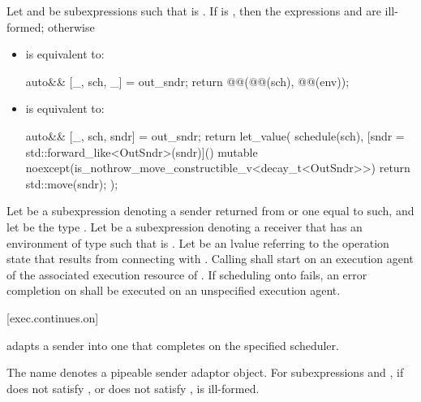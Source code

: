 \pnum
Let  and  be subexpressions
such that  is .
If  is ,
then the expressions  and\linebreak
{} are ill-formed; otherwise
\begin{itemize}
\item
{} is equivalent to:
\begin{codeblock}
auto&& [_, sch, _] = out_sndr;
return @@(@@(sch), @@(env));
\end{codeblock}
\item
{} is equivalent to:
\begin{codeblock}
auto&& [_, sch, sndr] = out_sndr;
return let_value(
  schedule(sch),
  [sndr = std::forward_like<OutSndr>(sndr)]() mutable
    noexcept(is_nothrow_move_constructible_v<decay_t<OutSndr>>) {
    return std::move(sndr);
  });
\end{codeblock}
\end{itemize}

\pnum
Let  be a subexpression denoting
a sender returned from  or one equal to such, and
let  be the type .
Let  be a subexpression denoting a receiver
that has an environment of type 
such that  is .
Let  be an lvalue referring to the operation state
that results from connecting  with .
Calling  shall start 
on an execution agent of the associated execution resource of .
If scheduling onto  fails,
an error completion on  shall be executed
on an unspecified execution agent.

[exec.continues.on]{}

\pnum
{} adapts a sender into one
that completes on the specified scheduler.

\pnum
The name  denotes a pipeable sender adaptor object.
For subexpressions  and ,
if  does not satisfy , or
 does not satisfy ,
 is ill-formed.

